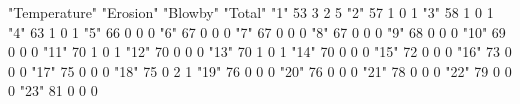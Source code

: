 "Temperature" "Erosion" "Blowby" "Total"
"1" 53 3 2 5
"2" 57 1 0 1
"3" 58 1 0 1
"4" 63 1 0 1
"5" 66 0 0 0
"6" 67 0 0 0
"7" 67 0 0 0
"8" 67 0 0 0
"9" 68 0 0 0
"10" 69 0 0 0
"11" 70 1 0 1
"12" 70 0 0 0
"13" 70 1 0 1
"14" 70 0 0 0
"15" 72 0 0 0
"16" 73 0 0 0
"17" 75 0 0 0
"18" 75 0 2 1
"19" 76 0 0 0
"20" 76 0 0 0
"21" 78 0 0 0
"22" 79 0 0 0
"23" 81 0 0 0
